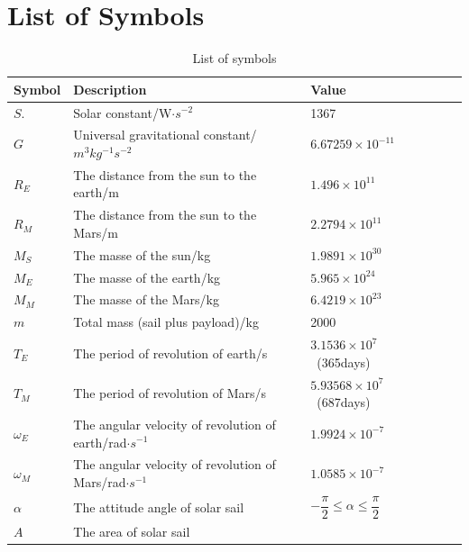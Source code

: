 \documentclass[../Paper.tex]{subfiles}
\begin{document}
\section{List of Symbols}

\renewcommand\arraystretch{1.5} %
\begin{table}[H]
\centering
\scriptsize %
\begin{tabular}{p{2cm}<{\centering} p{6.5cm}<{\centering} p{3cm}<{\centering} %
				p{1cm}<{\centering} p{1cm}<{\centering} }
		\hline
Symbol & Description & Value \\
	    \hline
	    \hline
$S.$ & Solar constant/W$\cdot s^{-2}$ & 1367 \\

$G$ & Universal gravitational constant/$m^3kg^{-1}s^{-2}$ & $6.67259\times10^{-11}$ \\

$R_E$ & The distance from the sun to the earth/m & $1.496\times10^{11}$ \\
		
$R_M$ & The distance from the sun to the Mars/m & $2.2794\times10^{11}$ \\

$M_S$ & The masse of the sun/kg & $1.9891\times10^{30}$  \\

$M_E$ & The masse of the earth/kg & $5.965\times10^{24}$  \\

$M_M$ & The masse of the Mars/kg & $6.4219\times10^{23}$  \\

$m$ & Total mass (sail plus payload)/kg & 2000~ \\

$T_E$ & The period of revolution of earth/s & $3.1536\times10^{7}$~(365days) \\

$T_M$ & The period of revolution of Mars/s & $5.93568\times10^{7}$~(687days)\\

$\omega_E$ & The angular velocity of revolution of earth/rad$\cdot s^{-1}$ & $1.9924\times10^{-7}$ \\

$\omega_M$ & The angular velocity of revolution of Mars/rad$\cdot s^{-1}$ & $1.0585\times10^{-7}$ \\

$\alpha$ & The attitude angle of solar sail & $-\dfrac{\pi}{2}\leq\alpha\leq\dfrac{\pi}{2}$ \\

$A$ & The area of solar sail &  \\
	    \hline
\end{tabular}

\caption{List of symbols}
\label{Table1}
\end{table}  
\end{document}
